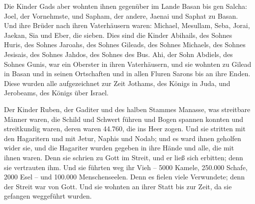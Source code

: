  Die Kinder Gads aber wohnten ihnen gegenüber im Lande
Basan bis gen Salcha:  Joel, der Vornehmste, und Sapham,
der andere, Jaenai und Saphat zu Basan.  Und ihre Brüder
nach ihren Vaterhäusern waren: Michael, Mesullam, Seba, Jorai, Jaekan,
Sia und Eber, die sieben.  Dies sind die Kinder Abihails,
des Sohnes Huris, des Sohnes Jaroahs, des Sohnes Gileads, des Sohnes
Michaels, des Sohnes Jesisais, des Sohnes Jahdos, des Sohnes des Bus.
 Ahi, der Sohn Abdiels, des Sohnes Gunis, war ein
Oberster in ihren Vaterhäusern,  und sie wohnten zu
Gilead in Basan und in seinen Ortschaften und in allen Fluren Sarons bis
an ihre Enden.  Diese wurden alle aufgezeichnet zur Zeit
Jothams, des Königs in Juda, und Jerobeams, des Königs über Israel.

 Der Kinder Ruben, der Gaditer und des halben Stammes
Manasse, was streitbare Männer waren, die Schild und Schwert führen und
Bogen spannen konnten und streitkundig waren, deren waren 44.760, die
ins Heer zogen.  Und sie stritten mit den Hagaritern und
mit Jetur, Naphis und Nodab;  und es ward ihnen geholfen
wider sie, und die Hagariter wurden gegeben in ihre Hände und alle, die
mit ihnen waren. Denn sie schrien zu Gott im Streit, und er ließ sich
erbitten; denn sie vertrauten ihm.  Und sie führten weg
ihr Vieh -- 5000 Kamele, 250.000 Schafe, 2000 Esel -- und 100.000
Menschenseelen.  Denn es fielen viele Verwundete; denn
der Streit war von Gott. Und sie wohnten an ihrer Statt bis zur Zeit, da
sie gefangen weggeführt wurden.

